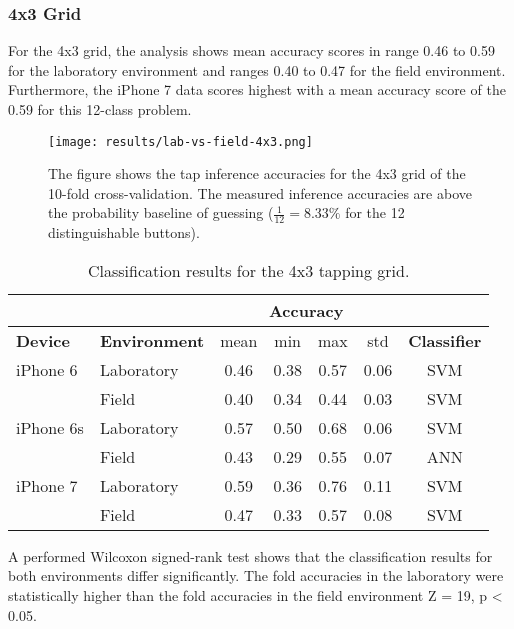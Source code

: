 \subsubsection{4x3 Grid}

For the 4x3 grid, the analysis shows mean accuracy scores in range 0.46 to 0.59 for the laboratory environment and ranges 0.40 to 0.47 for the field environment. Furthermore, the iPhone 7 data scores highest with a mean accuracy score of the 0.59 for this 12-class problem.

\begin{figure}[h!]
  \centering
  \texttt{[image: results/lab-vs-field-4x3.png]}
  \caption{The figure shows the tap inference accuracies for the 4x3 grid of the 10-fold cross-validation. The measured inference accuracies are above the probability baseline of guessing ($\frac{1}{12}= 8.33\%$ for the 12 distinguishable buttons).} \label{fig:participation}
\end{figure}

\begin{table}[h!]
  \centering
\begin{tabular}{|l|l|c|c|c|c|c|}
  \cline{3-6}
  \multicolumn{2}{c}{} & \multicolumn{4}{|c|}{\textbf{Accuracy}}  \\
  \hline
  \textbf{Device} & \textbf{Environment} & mean &   min &   max  & std &  \textbf{Classifier} \\
  \hline
  iPhone 6 & Laboratory &      0.46 &     0.38 &     0.57 &     0.06 &  SVM \\
  & Field &      0.40 &     0.34 &     0.44 &     0.03 &  SVM \\
  \hline
iPhone 6s  & Laboratory &      0.57 &     0.50 &     0.68 &     0.06 &  SVM \\
 &   Field    &      0.43 &     0.29 &     0.55 &     0.07 &  ANN \\
 \hline
iPhone 7   & Laboratory &      0.59 &     0.36 &     0.76 &     0.11 &  SVM \\
& Field &      0.47 &     0.33 &     0.57 &     0.08 &  SVM \\
  \hline
\end{tabular}
  \caption{Classification results for the 4x3 tapping grid.}
\end{table}

A performed Wilcoxon signed-rank test shows that the classification results for both environments differ significantly. The fold accuracies in the laboratory were statistically higher than the fold accuracies in the field environment Z = 19, p < 0.05.

